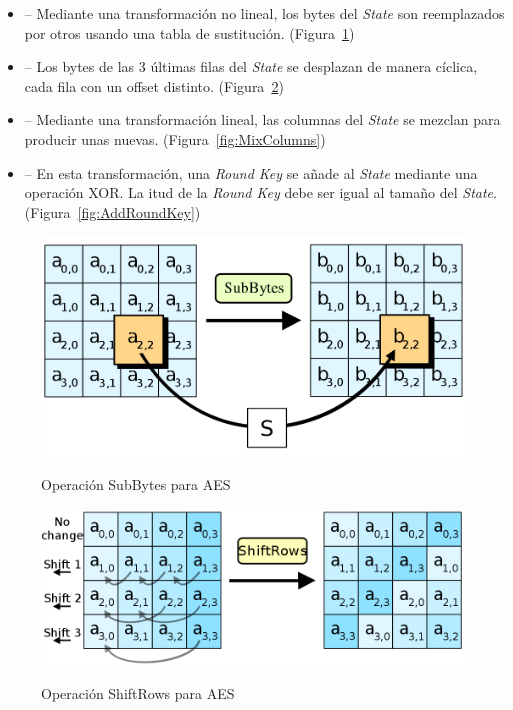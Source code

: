  \begin{itemize}
 \item {} -- Mediante una transformación no lineal,
 los bytes del \emph{State} son reemplazados por otros usando una tabla de sustitución.
 (Figura~\ref{fig:SubBytes})

 \item {} -- Los bytes de las 3 últimas filas del \emph{State}
 se desplazan de manera cíclica, cada fila con un offset distinto.
 (Figura~\ref{fig:ShiftRows})

 \item {} -- Mediante una transformación lineal,
 las columnas del \emph{State} se mezclan para producir unas nuevas.
 (Figura~\ref{fig:MixColumns})

 \item {} -- En esta transformación, una \emph{Round Key} se
 añade al \emph{State} mediante una operación XOR.
 La itud de la \emph{Round Key} debe ser igual al tamaño del \emph{State}.
 (Figura~\ref{fig:AddRoundKey})

 \end{itemize}

 \begin{figure}[ht]
   \centering
   \includegraphics[scale=0.25]{Figures/SubBytes}
   \decoRule
   \caption[SubBytes (AES)]{Operación SubBytes para AES} \emph{\parencite{Reference27}}
   \label{fig:SubBytes}
 \end{figure}

 \begin{figure}[ht]
   \centering
   \includegraphics[scale=0.25]{Figures/ShiftRows}
   \decoRule
   \caption[ShiftRows (AES)]{Operación ShiftRows para AES} \emph{\parencite{Reference28}}
   \label{fig:ShiftRows}
 \end{figure}

